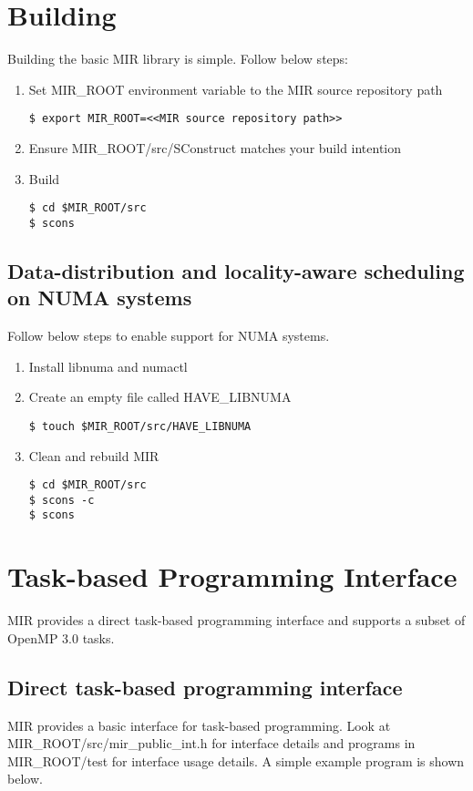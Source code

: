 \documentclass[11pt,a4paper,notitlepage]{article}
\begin{document}
\section{Building}
Building the basic MIR library is simple. Follow below steps:
\begin{enumerate}
\item Set MIR\_ROOT environment variable to the MIR source repository path
\begin{lstlisting}[style=BashInputStyle]
$ export MIR_ROOT=<<MIR source repository path>>
\end{lstlisting}
\item Ensure MIR\_ROOT/src/SConstruct matches your build intention
\item Build
\begin{lstlisting}[style=BashInputStyle]
$ cd $MIR_ROOT/src
$ scons 
\end{lstlisting}
\end{enumerate}

\subsection{Data-distribution and locality-aware scheduling on NUMA systems}
Follow below steps to enable support for NUMA systems.
\begin{enumerate}
\item Install libnuma and numactl
\item Create an empty file called HAVE\_LIBNUMA
\begin{lstlisting}[style=BashInputStyle]
$ touch $MIR_ROOT/src/HAVE_LIBNUMA
\end{lstlisting}
\item Clean and rebuild MIR
\begin{lstlisting}[style=BashInputStyle]
$ cd $MIR_ROOT/src
$ scons -c
$ scons 
\end{lstlisting}
\end{enumerate}

\section{Task-based Programming Interface}
MIR provides a direct task-based programming interface and supports a subset of OpenMP 3.0 tasks.

\subsection{Direct task-based programming interface}
MIR provides a basic interface for task-based programming. Look at MIR\_ROOT/src/mir\_public\_int.h for interface details and programs in MIR\_ROOT/test for interface usage details. A simple example program is shown below. 
\end{document}
